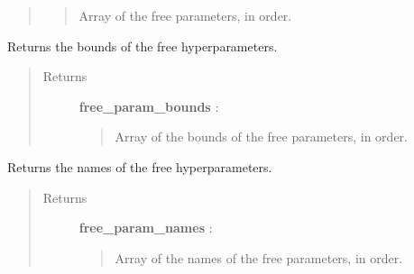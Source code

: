 \documentclass[letterpaper,10pt,english]{sphinxmanual}
\begin{document}
\begin{fulllineitems}
\begin{fulllineitems}
\begin{quote}
\begin{description}
\begin{quote}
Array of the free parameters, in order.
\end{quote}

\end{description}\end{quote}

\end{fulllineitems}


\begin{fulllineitems}
\label{gptools:gptools.mean.MeanFunction.free_param_bounds}
Returns the bounds of the free hyperparameters.
\begin{quote}\begin{description}
\item[{Returns}] \leavevmode
\textbf{free\_param\_bounds} : 
\begin{quote}

Array of the bounds of the free parameters, in order.
\end{quote}

\end{description}\end{quote}

\end{fulllineitems}


\begin{fulllineitems}
\label{gptools:gptools.mean.MeanFunction.free_param_names}
Returns the names of the free hyperparameters.
\begin{quote}\begin{description}
\item[{Returns}] \leavevmode
\textbf{free\_param\_names} : 
\begin{quote}

Array of the names of the free parameters, in order.
\end{quote}

\end{description}\end{quote}

\end{fulllineitems}


\end{fulllineitems}

\end{document}
